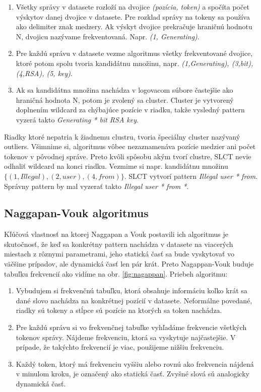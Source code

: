 \begin{enumerate}
  \item Všetky správy v datasete rozloží na dvojice \emph{(pozícia, token)} a spočíta počet výskytov danej dvojice v datasete. Pre rozklad správy na tokeny sa používa ako delimiter znak medzery. Ak výskyt dvojice prekračuje hraničnú hodnotu N, dvojicu nazývame frekventovaná. Napr. \emph{(1, Generating)}.
  \item Pre každú správu v datasete vezme algoritmus všetky frekventované dvojice, ktoré potom spolu tvoria kandidátnu množinu, napr. \emph{{(1,Generating), (3,bit), (4,RSA), (5, key)}}. 
  \item Ak sa kandidátna množina nachádza v logovacom súbore častejšie ako hraničná hodnota N, potom je zvolený sa cluster. Cluster je vytvorený doplnením wildcard za chýbajúce pozície v riadku, takže vysledný pattern vyzerá takto \emph{Generating * bit RSA key}.
\end{enumerate}

Riadky ktoré nepatria k žiadnemu clustru, tvoria špeciálny cluster nazývaný outliers. Všimnime si, algoritmus vôbec nezaznamenáva pozície medzier ani počet tokenov v pôvodnej správe. Preto kvôli spôsobu akým tvorí clustre, SLCT nevie odhaliť wildcard na konci riadku. Vezmime si napr. kandidátnu množinu $\{(1,Illegal), (2,user), (4,from)\} $. SLCT vytvorí pattern \emph{Illegal user * from}. Správny pattern by mal vyzerať takto  \emph{Illegal user * from *}.

\subsection{Naggapan-Vouk algoritmus}
Kľúčová vlastnosť na ktorej Naggapan a Vouk postavili ich algoritmus \parencite{nagappanvouk} je skutočnosť, že keď sa konkrétny pattern nachádza v datasete na viacerých miestach z rôznymi parametrami, jeho statická časť sa bude vyskytovať vo väčšine prípadov, ale dynamická časť len pár krát. Preto Nagappan-Vouk buduje tabuľku frekvencií ako vidíme na obr. \ref{fig:nagappan}. Priebeh algoritmu:

\begin{enumerate}
  \item Vybudujem si frekvenčnú tabuľku, ktorá obsahuje informáciu koľko krát sa dané slovo nachádza na konkrétnej pozícií v datasete. Neformálne povedané, riadky sú tokeny a stĺpce sú pozície na ktorých sa token nachádza.
  \item Pre každú správu si vo frekvenčnej tabuľke vyhľadáme frekvencie všetkých tokenov správy. Nájdeme frekvenciu, ktorá sa vyskytuje najčastejšie. V prípade, že takýchto frekvencií je viac, použijeme nižšiu frekvenciu.
  \item Každý token, ktorý má frekvenciu vyššiu alebo rovnú ako frekvencia nájdená v minulom kroku, je označený ako statická časť. Zvyšné slová sú analogicky dynamická časť.
\end{enumerate}

